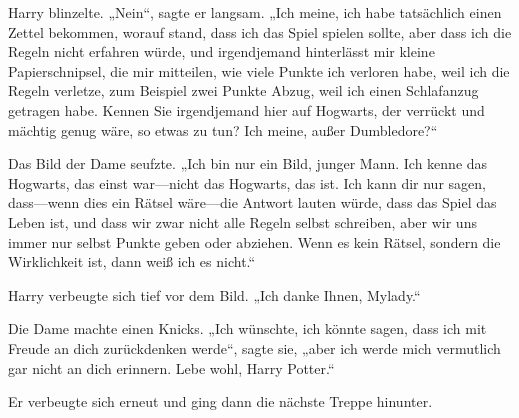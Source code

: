 Harry blinzelte. „Nein“, sagte er langsam. „Ich meine, ich habe tatsächlich einen Zettel bekommen, worauf stand, dass ich das Spiel spielen sollte, aber dass ich die Regeln nicht erfahren würde, und irgendjemand hinterlässt mir kleine Papierschnipsel, die mir mitteilen, wie viele Punkte ich verloren habe, weil ich die Regeln verletze, zum Beispiel zwei Punkte Abzug, weil ich einen Schlafanzug getragen habe. Kennen Sie irgendjemand hier auf Hogwarts, der verrückt und mächtig genug wäre, so etwas zu tun? Ich meine, außer Dumbledore?“

Das Bild der Dame seufzte. „Ich bin nur ein Bild, junger Mann. Ich kenne das Hogwarts, das einst war—nicht das Hogwarts, das ist. Ich kann dir nur sagen, dass—wenn dies ein Rätsel wäre—die Antwort lauten würde, dass das Spiel das Leben ist, und dass wir zwar nicht alle Regeln selbst schreiben, aber wir uns immer nur selbst Punkte geben oder abziehen. Wenn es kein Rätsel, sondern die Wirklichkeit ist, dann weiß ich es nicht.“

Harry verbeugte sich tief vor dem Bild. „Ich danke Ihnen, Mylady.“

Die Dame machte einen Knicks. „Ich wünschte, ich könnte sagen, dass ich mit Freude an dich zurückdenken werde“, sagte sie, „aber ich werde mich vermutlich gar nicht an dich erinnern. Lebe wohl, Harry Potter.“

Er verbeugte sich erneut und ging dann die nächste Treppe hinunter.

